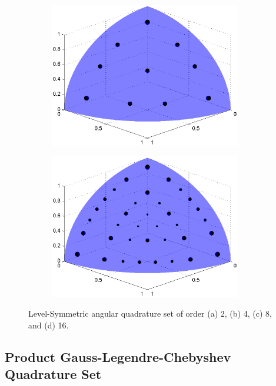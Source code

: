 \begin{figure}
	\vfill
	\begin{subfigure}[b]{0.48\textwidth}
		\centering
		\includegraphics[width=0.92\textwidth]{figures/sec_Sn/LS8.eps}
		\caption{}
	\end{subfigure}
	\hfill
	\begin{subfigure}[b]{0.48\textwidth}
		\centering
		\includegraphics[width=0.92\textwidth]{figures/sec_Sn/LS16.eps}
		\caption{}
	\end{subfigure}
\caption[Level-Symmetric angular quadrature set]{Level-Symmetric angular quadrature set of order (a) 2, (b) 4, (c) 8, and (d) 16.}
\label{fig::Sn_Angle_LS_Quads}
\end{figure}

\subsection{Product Gauss-Legendre-Chebyshev Quadrature Set}
\label{sec::Sn_Angle_PGLC}

